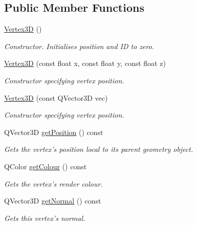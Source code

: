 \subsection*{Public Member Functions}
\begin{DoxyCompactItemize}
\item 
\hypertarget{class_vertex3_d_a41dee42f7502bdc4b04be44a4bf4bdbc}{\hyperlink{class_vertex3_d_a41dee42f7502bdc4b04be44a4bf4bdbc}{Vertex3\-D} ()}\label{class_vertex3_d_a41dee42f7502bdc4b04be44a4bf4bdbc}

\begin{DoxyCompactList}\small\item\em Constructor. Initialises position and I\-D to zero. \end{DoxyCompactList}\item 
\hyperlink{class_vertex3_d_a81b68cf7e781884ed457034bd5b63612}{Vertex3\-D} (const float x, const float y, const float z)
\begin{DoxyCompactList}\small\item\em Constructor specifying vertex position. \end{DoxyCompactList}\item 
\hyperlink{class_vertex3_d_a11ea685931b50972afb2ffda7bfaa984}{Vertex3\-D} (const Q\-Vector3\-D vec)
\begin{DoxyCompactList}\small\item\em Constructor specifying vertex position. \end{DoxyCompactList}\item 
Q\-Vector3\-D \hyperlink{class_vertex3_d_aefb3922097ae3d982370671c2c83fe1d}{get\-Position} () const 
\begin{DoxyCompactList}\small\item\em Gets the vertex's position local to its parent geometry object. \end{DoxyCompactList}\item 
Q\-Color \hyperlink{class_vertex3_d_a2bdd677bf1eb764a7dfa967aa7d2660b}{get\-Colour} () const 
\begin{DoxyCompactList}\small\item\em Gets the vertex's render colour. \end{DoxyCompactList}\item 
Q\-Vector3\-D \hyperlink{class_vertex3_d_a02604a70c43c9ef567684174e8406959}{get\-Normal} () const 
\begin{DoxyCompactList}\small\item\em Gets this vertex's normal. \end{DoxyCompactList}\item 

\end{DoxyCompactItemize}
